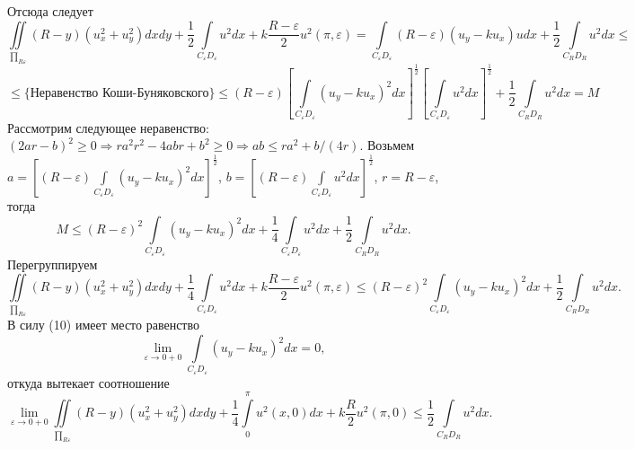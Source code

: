 \documentclass[9pt]{article}
\begin{document}
Отсюда следует
\begin{equation*}
	\iint\limits_{\prod_{R\varepsilon}} \left(R - y\right) \left(u_x^2 + u_y^2\right) dx dy + \dfrac{1}{2}\int\limits_{C_\varepsilon D_\varepsilon} u^2 dx +k\dfrac{R - \varepsilon}{2}u^2(\pi, \varepsilon)  =\int\limits_{C_\varepsilon D_\varepsilon} \left(R - \varepsilon \right) \left(u_y - ku_x\right)u dx + \dfrac12  \int\limits_{C_R D_R} u^2 dx \leq 
\end{equation*}
\begin{equation*}
	\leq \{ \text{Неравенство Коши-Буняковского} \} \leq \left(R - \varepsilon\right) \left[\int\limits_{C_\varepsilon D_\varepsilon} \left( u_y - ku_x\right)^2 dx \right]^{\frac12} \left[\int\limits_{C_\varepsilon D_\varepsilon} u^2 dx \right]^{\frac12} + \dfrac12 \int\limits_{C_RD_R} u^2 dx = M
\end{equation*}
Рассмотрим следующее неравенство: $(2ar - b)^2 \geq 0 \Rightarrow ra^2r^2 - 4abr + b^2 \geq 0 \Rightarrow ab \leq ra^2 + b/ (4r)$. Возьмем $a =  \left[\left(R - \varepsilon\right)\int\limits_{C_\varepsilon D_\varepsilon} \left( u_y - ku_x\right)^2 dx \right]^{\frac12}$, $b = \left[\left(R - \varepsilon\right)\int\limits_{C_\varepsilon D_\varepsilon} u^2 dx \right]^{\frac12}$, $r = R - \varepsilon$, тогда
\begin{equation*}
	M \leq \left(R - \varepsilon\right)^2 \int\limits_{C_\varepsilon D_\varepsilon} \left( u_y - ku_x\right)^2 dx + \dfrac14 \int\limits_{C_\varepsilon D_\varepsilon} u^2 dx + \dfrac12 \int\limits_{C_RD_R} u^2 dx.
\end{equation*}
Перегруппируем
\begin{equation*}
	\iint\limits_{\prod_{R\varepsilon}} \left(R - y\right) \left(u_x^2 + u_y^2\right) dx dy + \dfrac{1}{4}\int\limits_{C_\varepsilon D_\varepsilon} u^2 dx +k\dfrac{R - \varepsilon}{2}u^2(\pi, \varepsilon) \leq \left(R - \varepsilon\right)^2 \int\limits_{C_\varepsilon D_\varepsilon} \left( u_y - ku_x\right)^2 dx + \dfrac12 \int\limits_{C_RD_R} u^2 dx.
\end{equation*}
В силу (10) имеет место равенство
\begin{equation*}
	\lim\limits_{\varepsilon \to 0 + 0} \int\limits_{C_\varepsilon D_\varepsilon} \left(u_y - ku_x\right)^2 dx = 0,
\end{equation*}
откуда вытекает соотношение
\begin{equation*}
	\lim\limits_{\varepsilon \to 0 + 0} \iint\limits_{\prod_{R\varepsilon}} \left(R - y\right) \left(u_x^2 + u_y^2 \right) dx dy + \dfrac14 \int\limits_0^\pi u^2(x,0) dx + k\dfrac{R}{2}u^2(\pi,0) \leq \dfrac12 \int\limits_{C_RD_R} u^2 dx.
\end{equation*}
\end{document}

